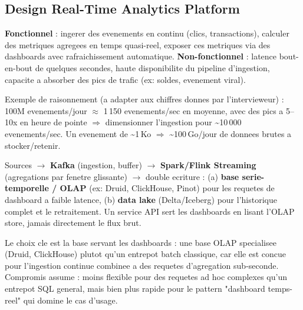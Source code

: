 \documentclass[11pt,a4paper]{article}
\newenvironment{sujet}[1]{%
  \subsection{#1}
}{%
  \bigskip
}
\begin{document}
\begin{sujet}{Design Real-Time Analytics Platform}

\begin{req}
\textbf{Fonctionnel} : ingerer des evenements en continu (clics, transactions), calculer des metriques agregees en temps quasi-reel, exposer ces metriques via des dashboards avec rafraichissement automatique. \textbf{Non-fonctionnel} : latence bout-en-bout de quelques secondes, haute disponibilite du pipeline d'ingestion, capacite a absorber des pics de trafic (ex: soldes, evenement viral).
\end{req}

\begin{estim}
Exemple de raisonnement (a adapter aux chiffres donnes par l'intervieweur) : 100M evenements/jour $\approx$ 1\,150 evenements/sec en moyenne, avec des pics a 5--10x en heure de pointe $\Rightarrow$ dimensionner l'ingestion pour \textasciitilde10\,000 evenements/sec. Un evenement de \textasciitilde1\,Ko $\Rightarrow$ \textasciitilde100\,Go/jour de donnees brutes a stocker/retenir.
\end{estim}

\begin{archbox}
Sources $\to$ \textbf{Kafka} (ingestion, buffer) $\to$ \textbf{Spark/Flink Streaming} (agregations par fenetre glissante) $\to$ double ecriture : (a) \textbf{base serie-temporelle / OLAP} (ex: Druid, ClickHouse, Pinot) pour les requetes de dashboard a faible latence, (b) \textbf{data lake} (Delta/Iceberg) pour l'historique complet et le retraitement. Un service API sert les dashboards en lisant l'OLAP store, jamais directement le flux brut.
\end{archbox}

\begin{tradeoff}
Le choix cle est la base servant les dashboards : une base OLAP specialisee (Druid, ClickHouse) plutot qu'un entrepot batch classique, car elle est concue pour l'ingestion continue combinee a des requetes d'agregation sub-seconde. Compromis assume : moins flexible pour des requetes ad hoc complexes qu'un entrepot SQL general, mais bien plus rapide pour le pattern "dashboard temps-reel" qui domine le cas d'usage.
\end{tradeoff}

\end{sujet}
\end{document}
